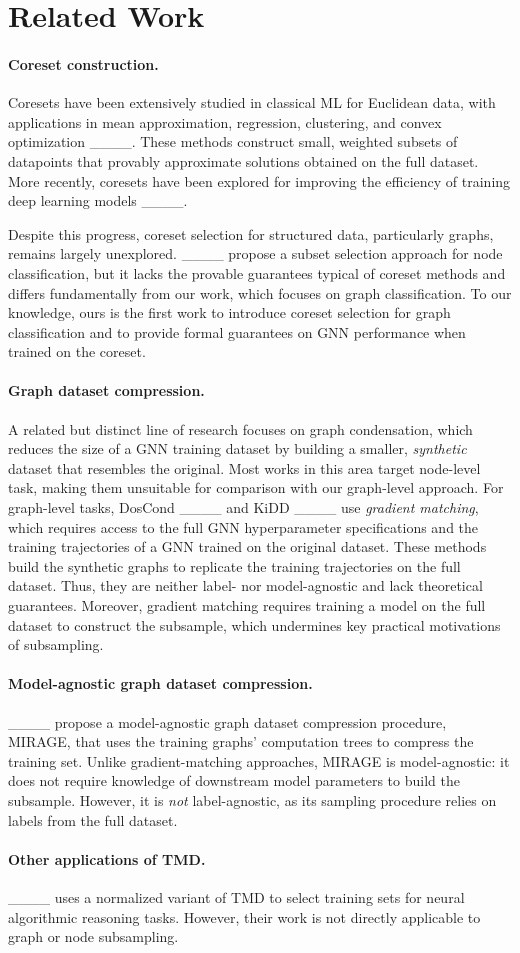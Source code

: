 \section{Related Work}
\label{sec:related-work}

\paragraph{Coreset construction.}
Coresets have been extensively studied in classical ML for Euclidean data, with applications in mean approximation, regression, clustering, and convex optimization ____. These methods construct small, weighted subsets of datapoints that provably approximate solutions obtained on the full dataset. More recently, coresets have been explored for improving the efficiency of training deep learning models ____.  

Despite this progress, coreset selection for structured data, particularly graphs, remains largely unexplored. ____ propose a subset selection approach for node classification, but it lacks the provable guarantees typical of coreset methods and differs fundamentally from our work, which focuses on graph classification. To our knowledge, ours is the first work to introduce coreset selection for graph classification and to provide formal guarantees on GNN performance when trained on the coreset.


\paragraph{Graph dataset compression.}{ A related but distinct line of research focuses on graph condensation, which reduces the size of a GNN training dataset by building a smaller, \emph{synthetic} dataset that resembles the original. Most works in this area target node-level task, making them unsuitable for comparison with our graph-level approach. For graph-level tasks, DosCond ____ and KiDD ____ use \emph{gradient matching}, which requires access to the full GNN hyperparameter specifications and the training trajectories of a GNN trained on the original dataset. These methods build the synthetic graphs to replicate the training trajectories on the full dataset. Thus, they are neither label- nor model-agnostic and lack theoretical guarantees. Moreover, gradient matching requires training a model on the full dataset to construct the subsample, which undermines key practical motivations of subsampling.
}

\paragraph{Model-agnostic graph dataset compression.} ____ propose a model-agnostic graph dataset compression procedure, MIRAGE, that uses the training graphs' computation trees to compress the training set. Unlike gradient-matching approaches, MIRAGE is model-agnostic: it does not require knowledge of downstream model parameters to build the subsample. However, it is \emph{not} label-agnostic, as its sampling procedure relies on labels from the full dataset.



\paragraph{Other applications of TMD.} ____ uses a normalized variant of TMD to select training sets for neural algorithmic reasoning tasks. However, their work is not directly applicable to graph or node subsampling.